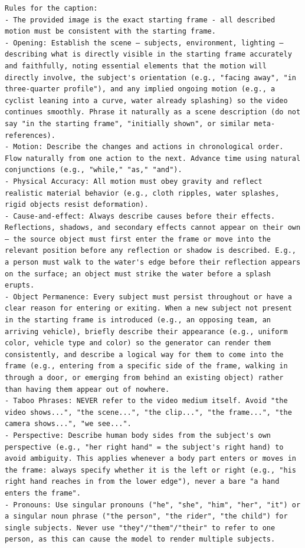 \begin{tcolorbox}
\begin{Verbatim}[breaklines=true,breakanywhere=true,fontsize=\scriptsize]
Rules for the caption:
- The provided image is the exact starting frame - all described motion must be consistent with the starting frame.
- Opening: Establish the scene — subjects, environment, lighting — describing what is directly visible in the starting frame accurately and faithfully, noting essential elements that the motion will directly involve, the subject's orientation (e.g., "facing away", "in three-quarter profile"), and any implied ongoing motion (e.g., a cyclist leaning into a curve, water already splashing) so the video continues smoothly. Phrase it naturally as a scene description (do not say "in the starting frame", "initially shown", or similar meta-references).
- Motion: Describe the changes and actions in chronological order. Flow naturally from one action to the next. Advance time using natural conjunctions (e.g., "while," "as," "and").
- Physical Accuracy: All motion must obey gravity and reflect realistic material behavior (e.g., cloth ripples, water splashes, rigid objects resist deformation).
- Cause-and-effect: Always describe causes before their effects. Reflections, shadows, and secondary effects cannot appear on their own — the source object must first enter the frame or move into the relevant position before any reflection or shadow is described. E.g., a person must walk to the water's edge before their reflection appears on the surface; an object must strike the water before a splash erupts.
- Object Permanence: Every subject must persist throughout or have a clear reason for entering or exiting. When a new subject not present in the starting frame is introduced (e.g., an opposing team, an arriving vehicle), briefly describe their appearance (e.g., uniform color, vehicle type and color) so the generator can render them consistently, and describe a logical way for them to come into the frame (e.g., entering from a specific side of the frame, walking in through a door, or emerging from behind an existing object) rather than having them appear out of nowhere.
- Taboo Phrases: NEVER refer to the video medium itself. Avoid "the video shows...", "the scene...", "the clip...", "the frame...", "the camera shows...", "we see...".
- Perspective: Describe human body sides from the subject's own perspective (e.g., "her right hand" = the subject's right hand) to avoid ambiguity. This applies whenever a body part enters or moves in the frame: always specify whether it is the left or right (e.g., "his right hand reaches in from the lower edge"), never a bare "a hand enters the frame".
- Pronouns: Use singular pronouns ("he", "she", "him", "her", "it") or a singular noun phrase ("the person", "the rider", "the child") for single subjects. Never use "they"/"them"/"their" to refer to one person, as this can cause the model to render multiple subjects.

\end{Verbatim}
\end{tcolorbox}
